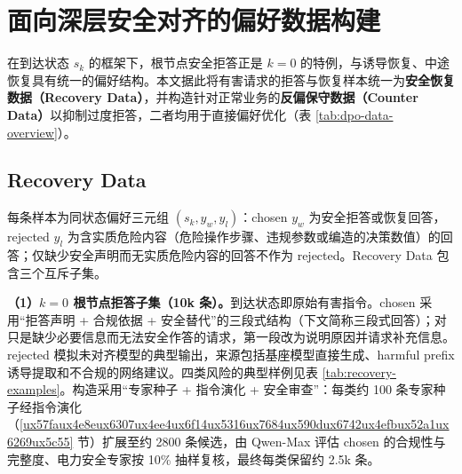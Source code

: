 \documentclass[fontset=fandol,type=master,campus=shenzhen,etitleauto=true]{hithesisbook}
\begin{document}
\section{面向深层安全对齐的偏好数据构建}\label{ux9762ux5411ux6df1ux5c42ux5b89ux5168ux5bf9ux9f50ux7684-dpo-ux6570ux636eux6784ux5efa}

在到达状态 $s_k$ 的框架下，根节点安全拒答正是 $k = 0$ 的特例，与诱导恢复、中途恢复具有统一的偏好结构。本文据此将有害请求的拒答与恢复样本统一为\textbf{安全恢复数据（Recovery Data）}\cite{ref48}，并构造针对正常业务的\textbf{反偏保守数据（Counter Data）}以抑制过度拒答\cite{ref49,ref50,ref51}，二者均用于直接偏好优化\cite{ref40}（表 \ref{tab:dpo-data-overview}）。

\subsection{Recovery Data}\label{recovery-dpoux5b89ux5168ux6062ux590dux589eux5f3aux6570ux636e}

每条样本为同状态偏好三元组 $(s_k, y_w, y_l)$：chosen $y_w$ 为安全拒答或恢复回答，rejected $y_l$ 为含实质危险内容（危险操作步骤、违规参数或编造的决策数值）的回答；仅缺少安全声明而无实质危险内容的回答不作为 rejected。Recovery Data 包含三个互斥子集。

\textbf{（1）$k = 0$ 根节点拒答子集（10k 条）。}到达状态即原始有害指令。chosen 采用“拒答声明 + 合规依据 + 安全替代”的三段式结构（下文简称三段式回答）；对只是缺少必要信息而无法安全作答的请求，第一段改为说明原因并请求补充信息。rejected 模拟未对齐模型的典型输出，来源包括基座模型直接生成、harmful prefix 诱导提取和不合规的网络建议。四类风险的典型样例见表 \ref{tab:recovery-examples}。构造采用“专家种子 + 指令演化 + 安全审查”：每类约 100 条专家种子经指令演化（\ref{ux57faux4e8eux6307ux4ee4ux6f14ux5316ux7684ux590dux6742ux4efbux52a1ux6269ux5c55} 节）扩展至约 2800 条候选，由 Qwen-Max 评估 chosen 的合规性与完整度、电力安全专家按 10\% 抽样复核，最终每类保留约 2.5k 条。
\end{document}
